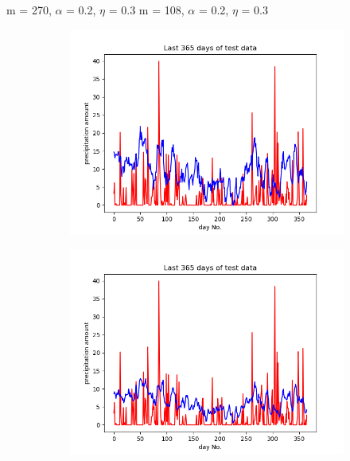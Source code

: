 \documentclass{beamer}
\begin{document}
\begin{frame}{\small{m = 270, $\alpha$ = 0.2, $\eta$ = 0.3} \hspace{4cm} \small{m = 108, $\alpha$ = 0.2, $\eta$ = 0.3}}
\begin{figure}
        \begin{subfigure}{\textwidth}
            \includegraphics[width=0.45\linewidth]{plots/plot_test_model-model11_20_22-time_11_20_22.png}
        \end{subfigure}
        \begin{subfigure}{\textwidth}
            \includegraphics[width=0.45\linewidth]{plots/plot_test_model-model14_14_49-time_14_14_49.png}
        \end{subfigure}
    \end{figure}

\end{frame}




\end{document}
